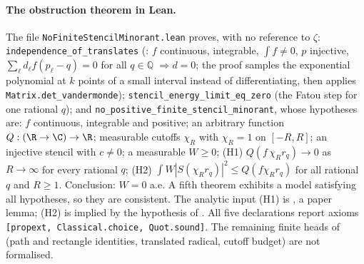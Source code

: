 \paragraph{The obstruction theorem in Lean.} The file \texttt{NoFiniteStencilMinorant.lean} proves, with no reference to $\zeta$:
\texttt{independence\_of\_translates} (: $f$ continuous, integrable, $\int f\ne0$, $p$ injective, $\sum_\ell d_\ell f(p_\ell-q)=0$
for all $q\in\mathbb Q$ $\Rightarrow d=0$; the proof samples the exponential polynomial at $k$ points of a small interval instead of
differentiating, then applies \texttt{Matrix.det\_vandermonde}); \texttt{stencil\_energy\_limit\_eq\_zero} (the Fatou step for one rational
$q$); and \texttt{no\_positive\_finite\_stencil\_minorant}, whose hypotheses are: $f$ continuous, integrable and positive; an arbitrary
function $Q:(\R\to\C)\to\R$; measurable cutoffs $\chi_R$ with $\chi_R=1$ on $[-R,R]$; an injective stencil with $c\ne0$; a measurable
$W\ge0$; (H1) $Q(f\,\chi_Rr_q)\to0$ as $R\to\infty$ for every rational $q$; (H2) $\int W|S(\chi_Rr_q)|^2\le Q(f\chi_Rr_q)$ for all
rational $q$ and $R\ge1$. Conclusion: $W=0$ a.e. A fifth theorem exhibits a model satisfying all hypotheses, so they are consistent.
The analytic input (H1) is , a paper lemma; (H2) is implied by the hypothesis of . All five
declarations report axioms \texttt{[propext, Classical.choice, Quot.sound]}. The remaining finite heads of 
(path and rectangle identities, translated radical, cutoff budget) are not formalised.
